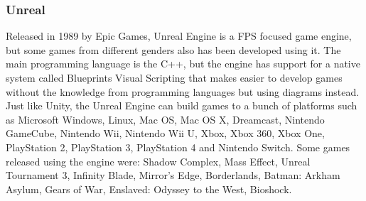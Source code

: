 \subsubsection{Unreal}
Released in 1989 by Epic Games, Unreal Engine is a FPS focused game engine, but some games from different genders also has been developed using it. The main programming language is the C++, but the engine has support for a native system called Blueprints Visual Scripting that makes easier to develop games without the knowledge from programming languages but using diagrams instead. Just like Unity, the Unreal Engine can build games to a bunch of platforms such as Microsoft Windows, Linux, Mac OS, Mac OS X, Dreamcast, Nintendo GameCube, Nintendo Wii, Nintendo Wii U, Xbox, Xbox 360, Xbox One, PlayStation 2, PlayStation 3, PlayStation 4 and Nintendo Switch\cite{UnrealAbout}. Some games released using the engine were: Shadow Complex, Mass Effect, Unreal Tournament 3, Infinity Blade, Mirror’s Edge, Borderlands, Batman: Arkham Asylum, Gears of War, Enslaved: Odyssey to the West, Bioshock\cite{UnrealGames}.